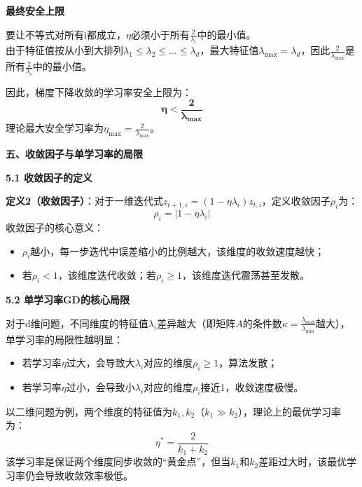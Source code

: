 \documentclass[10pt]{article}
\numberwithin{equation}{section}
\theoremstyle{plain}
\theoremstyle{definition}
\theoremstyle{remark}
\begin{document}
{\par\vspace{0.8ex}\noindent\normalsize\bfseries\color{secblue} 最终安全上限\par}
要让不等式对所有i都成立，$\eta$必须小于所有$\frac{2}{\lambda_i}$中的最小值。\\
由于特征值按从小到大排列$\lambda_1 \le \lambda_2 \le \dots \le \lambda_d$，最大特征值$\lambda_{\text{max}} = \lambda_d$，因此$\frac{2}{\lambda_{\text{max}}}$是所有$\frac{2}{\lambda_i}$中的最小值。

因此，梯度下降收敛的学习率安全上限为：
\[ \boldsymbol{\eta < \frac{2}{\lambda_{\text{max}}}} \]
理论最大安全学习率为$\eta_{\text{max}} = \frac{2}{\lambda_{\text{max}}}$。

{\par\vspace{1ex}\noindent\large\bfseries\color{brandD} 五、收敛因子与单学习率的局限\par}
{\par\vspace{0.8ex}\noindent\normalsize\bfseries\color{accentD} 5.1 收敛因子的定义\par}
\textbf{定义2（收敛因子）}：对于一维迭代式$z_{t+1,i} = (1 - \eta \lambda_i) z_{t,i}$，定义收敛因子$\rho_i$为：
\[ \rho_i = |1 - \eta \lambda_i| \]
收敛因子的核心意义：
\begin{itemize}[leftmargin=*,nosep]
    \item $\rho_i$越小，每一步迭代中误差缩小的比例越大，该维度的收敛速度越快；
    \item 若$\rho_i < 1$，该维度迭代收敛；若$\rho_i \ge 1$，该维度迭代震荡甚至发散。
\end{itemize}

{\par\vspace{0.8ex}\noindent\normalsize\bfseries\color{secblue} 5.2 单学习率GD的核心局限\par}
对于d维问题，不同维度的特征值$\lambda_i$差异越大（即矩阵$A$的条件数$\kappa = \frac{\lambda_{\text{max}}}{\lambda_{\text{min}}}$越大），单学习率的局限性越明显：
\begin{itemize}[leftmargin=*,nosep]
    \item 若学习率$\eta$过大，会导致大$\lambda_i$对应的维度$\rho_i \ge 1$，算法发散；
    \item 若学习率$\eta$过小，会导致小$\lambda_i$对应的维度$\rho_i$接近1，收敛速度极慢。
\end{itemize}
以二维问题为例，两个维度的特征值为$k_1,k_2$（$k_1 \gg k_2$），理论上的最优学习率为：
\[ \eta^* = \frac{2}{k_1 + k_2} \]
该学习率是保证两个维度同步收敛的“黄金点”，但当$k_1$和$k_2$差距过大时，该最优学习率仍会导致收敛效率极低。
\end{document}
